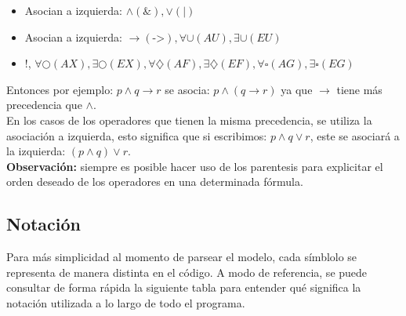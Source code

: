 \documentclass[11pt]{article}
\begin{document}
  \begin{itemize}
    \item Asocian a izquierda: $\land (\&) , \lor (|)$
    \item Asocian a izquierda: $\rightarrow (\texttt{->}), \forall \cup (AU), \exists \cup (EU)$
    \item !, $\forall \bigcirc (AX), \exists \bigcirc (EX), \forall \diamondsuit (AF), \exists \diamondsuit (EF),
          \forall \square (AG), \exists \square (EG)$
  \end{itemize}

  Entonces por ejemplo: $p \land q \rightarrow r$ se asocia: $p \land (q \rightarrow r)$
  ya que $\rightarrow$ tiene más precedencia que $\land$. \\
  
  En los casos de los operadores que tienen la misma precedencia, se utiliza
  la asociación a izquierda, esto significa que si escribimos: $p \land q \lor r$, 
  este se asociará a la izquierda: $(p \land q) \lor r$. \\

  \textbf{Observación:} siempre es posible hacer uso de los parentesis para 
  explicitar el orden deseado de los operadores en una determinada fórmula.

\subsection{Notación}

Para más simplicidad al momento de parsear el modelo, cada símblolo
se representa de manera distinta en el código. A modo de referencia,
se puede consultar de forma rápida la siguiente tabla para entender
qué significa la notación utilizada a lo largo de todo el programa.
\end{document}
